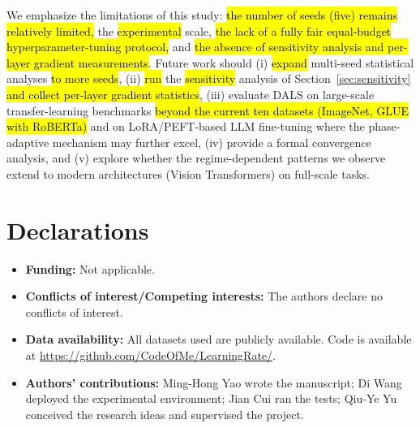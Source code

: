 \documentclass[a4paper,fleqn]{cas-dc}
\begin{document}
We emphasize the limitations of this study: \hl{the number of seeds (five) remains relatively limited,} the \hl{experimental} scale, \hl{the lack of a fully fair equal-budget hyperparameter-tuning protocol,} and \hl{the absence of sensitivity analysis and per-layer gradient measurements}. Future work should (i) \hl{expand} multi-seed statistical analyses \hl{to more seeds}, (ii) \hl{run} the \hl{sensitivity} analysis of Section~\ref{sec:sensitivity} \hl{and collect per-layer gradient statistics}, (iii) evaluate DALS on large-scale transfer-learning benchmarks \hl{beyond the current ten datasets (ImageNet, GLUE with RoBERTa)} and on LoRA/PEFT-based LLM fine-tuning where the phase-adaptive mechanism may further excel, (iv) provide a formal convergence analysis, and (v) explore whether the regime-dependent patterns we observe extend to modern architectures (Vision Transformers) on full-scale tasks.

\section*{Declarations}

\begin{itemize}
\item \textbf{Funding:} Not applicable.
\item \textbf{Conflicts of interest/Competing interests:} The authors declare no conflicts of interest.
\item \textbf{Data availability:} All datasets used are publicly available. Code is available at \url{https://github.com/CodeOfMe/LearningRate/}.
\item \textbf{Authors' contributions:} Ming-Hong Yao wrote the manuscript; Di Wang deployed the experimental environment; Jian Cui ran the tests; Qiu-Ye Yu conceived the research ideas and supervised the project.
\end{itemize}

\printcredits


\gdef\bibfont{\fontsize{8pt}{9pt}\selectfont}

\end{document}
